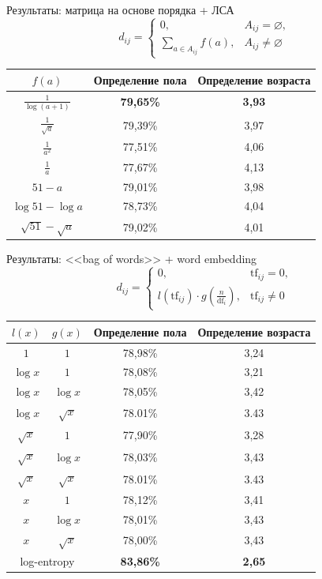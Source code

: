 \documentclass{beamer}
\begin{document}
\begin{frame}{Результаты: матрица на основе порядка + ЛСА}
    \[d_{ij} = \begin{cases}
              0,& A_{ij} = \varnothing,\\
              \sum\limits_{a \in A_{ij}}{f(a)},& A_{ij} \ne \varnothing
          \end{cases}\]
\begin{table}[!h]
\centering
\begin{tabular}{|c|c|c|}\hline
    \boldmath$f(a)$ & \textbf{Определение пола} & \textbf{Определение возраста} \\\hline
    $\frac{1}{\log(a + 1)}$ & \textbf{79,65\%} & \textbf{3,93} \\\hline
    $\frac{1}{\sqrt{a}}$ & 79,39\% & 3,97 \\\hline
    $\frac{1}{a^2}$ & 77,51\% & 4,06 \\\hline
    $\frac{1}{a}$ & 77,67\% & 4,13 \\\hline
    $51 - a$ & 79,01\% & 3,98 \\\hline
    $\log{51} - \log{a}$ & 78,73\% & 4,04 \\\hline
    $\sqrt{51} - \sqrt{a}$ & 79,02\% & 4,01 \\\hline
\end{tabular}
\end{table}
\end{frame}

\begin{frame}{Результаты: <<bag of words>> + word embedding}
    \[d_{ij} = \begin{cases}
              0,& \mathrm{tf}_{ij} = 0,\\
              l(\mathrm{tf}_{ij}) \cdot g(\frac{n}{\mathrm{df}_{i}}),& \mathrm{tf}_{ij} \ne 0
        \end{cases}\]
\begin{table}[!h]
\centering
\begin{tabular}{|c|c|c|c|}\hline
    \boldmath$l(x)$ & \boldmath$g(x)$ & \textbf{Определение пола} & \textbf{Определение возраста} \\\hline
    $1$ & $1$ & 78,98\% & 3,24 \\\hline
    $\log{x}$ & $1$ & 78,08\% & 3,21 \\\hline %
    $\log{x}$ & $\log{x}$ & 78,05\% & 3,42 \\\hline
    $\log{x}$ & $\sqrt{x}$ & 78.01\% & 3.43 \\\hline
    $\sqrt{x}$ & $1$ & 77,90\% & 3,28 \\\hline %
    $\sqrt{x}$ & $\log{x}$ & 78,03\% & 3,43 \\\hline
    $\sqrt{x}$ & $\sqrt{x}$ & 78.01\% & 3.43 \\\hline
    $x$ & $1$ & 78,12\% & 3,41 \\\hline
    $x$ & $\log{x}$ & 78,01\% & 3,43 \\\hline
    $x$ & $\sqrt{x}$ & 78,00\% & 3,43 \\\hline
    \multicolumn{2}{|c|}{log-entropy} & \textbf{83,86\%} & \textbf{2,65} \\\hline
\end{tabular}
\end{table}
\end{frame}
\end{document}
